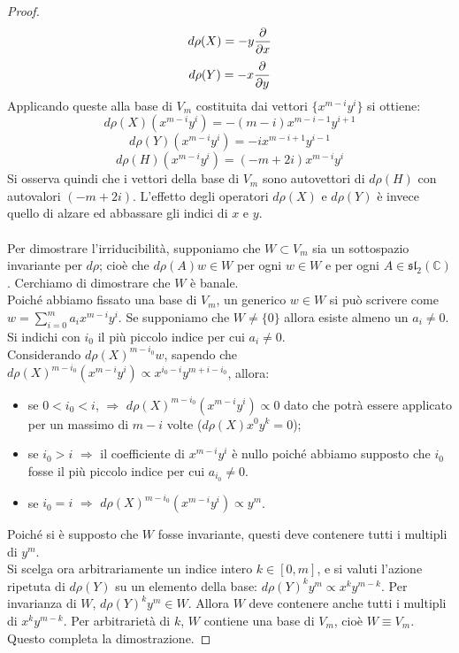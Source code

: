 \documentclass[12pt,a4paper]{report}
\theoremstyle{definition}
\theoremstyle{Theorem}
\theoremstyle{definition}
\theoremstyle{definition}
\theoremstyle{definition}
\begin{document}
\begin{proof}
	\begin{equation*}
	d\rho(X)=-y{\partial\over\partial x}
\end{equation*}
	\begin{equation*}
	d\rho(Y)=-x{\partial\over\partial y}
\end{equation*}
	Applicando queste alla base di $V_m$ costituita dai vettori $\{x^{m-i}y^i\}$ si ottiene:
	$$d\rho(X)(x^{m-i}y^i)=-(m-i)x^{m-i-1}y^{i+1}$$
	$$d\rho(Y)(x^{m-i}y^i)=-ix^{m-i+1}y^{i-1}$$
	$$d\rho(H)(x^{m-i}y^i)=(-m+2i)x^{m-i}y^i$$
	Si osserva quindi che i vettori della base di $V_m$ sono autovettori di $d\rho(H)$ con autovalori $(-m+2i)$. L'effetto degli operatori $d\rho(X)$ e $d\rho(Y)$ è invece quello di alzare ed abbassare gli indici di $x$ e $y$.\\
	\\
	Per dimostrare l'irriducibilità, supponiamo che $W\subset V_m$ sia un sottospazio invariante per $d\rho$; cioè che $d\rho(A)w\in W$ per ogni $w\in W$ e per ogni $A\in \mathfrak{sl_2(\mathbb{C})}$. Cerchiamo di dimostrare che $W$ è banale. \\Poiché abbiamo fissato una base di $V_m$, un generico $w\in W$ si può scrivere come $w=\sum_{i=0}^{m}a_ix^{m-i}y^i$. Se supponiamo che $W\neq\{0\}$ allora esiste almeno un $a_i\neq 0$.
	Si indichi con $i_0$ il più piccolo indice per cui $a_i\neq 0$. \\
	Considerando $d\rho(X)^{m-i_0}w$, sapendo che $d\rho(X)^{m-i_0}(x^{m-i}y^i)\propto x^{i_0-i}y^{m+i-i_0}$, allora:
	\begin{itemize}
		\item se $0<i_0<i$, $\Rightarrow$ $d\rho(X)^{m-i_0}(x^{m-i}y^i)\propto 0$ dato che potrà essere applicato per un massimo di $m-i$ volte ($d\rho(X)x^0y^k=0$);
		\item se $i_0>i$ $\Rightarrow$ il coefficiente di $x^{m-i}y^{i}$ è nullo poiché abbiamo supposto che $i_0$ fosse il più piccolo indice per cui $a_{i_0}\neq 0$. 
		\item se $i_0=i$ $\Rightarrow$ $d\rho(X)^{m-i_0}(x^{m-i}y^i)\propto y^m$.
	\end{itemize} 
	Poiché si è supposto che $W$ fosse invariante, questi deve contenere tutti i multipli di $y^m$.\\
	Si scelga ora arbitrariamente un indice intero $k\in[0,m]$, e si valuti l'azione ripetuta di $d\rho(Y)$ su un elemento della base: $d\rho(Y)^ky^m\propto x^ky^{m-k}$.
	Per invarianza di $W$, $d\rho(Y)^ky^m\in W$. Allora $W$ deve contenere anche tutti i multipli di $x^ky^{m-k}$. Per arbitrarietà di $k$, $W$ contiene una base di $V_m$, cioè $W\equiv V_m$.\\
	Questo completa la dimostrazione.
\end{proof}
\end{document}
